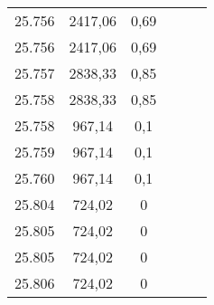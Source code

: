 \begin{tabularx}{8.2cm}{@{}ccc|ccc@{}}
25.756 & 2417,06 & 0,69 &  &  & \\
25.756 & 2417,06 & 0,69 &  &  & \\
25.757 & 2838,33 & 0,85 &  &  & \\
25.758 & 2838,33 & 0,85 &  &  & \\
25.758 & 967,14 & 0,1 &  &  & \\
25.759 & 967,14 & 0,1 &  &  & \\
25.760 & 967,14 & 0,1 &  &  & \\
25.804 & 724,02 & 0 &  &  & \\
25.805 & 724,02 & 0 &  &  & \\
25.805 & 724,02 & 0 &  &  & \\
25.806 & 724,02 & 0 &  &  & \\
  \bottomrule
\end{tabularx}
